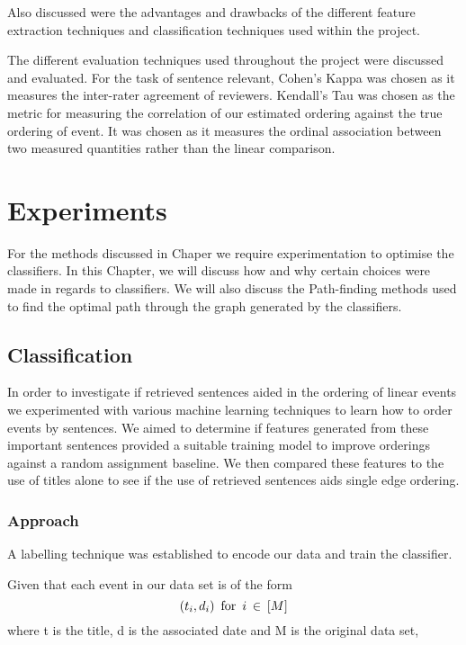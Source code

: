 \documentclass[bsc,frontabs,twoside,singlespacing,parskip,deptreport]{infthesis}     %
\begin{document}
Also discussed were the advantages and  drawbacks of the different feature extraction techniques and classification
techniques used within the project.

The different evaluation techniques used throughout the project were discussed and evaluated. 
For the task of sentence relevant, Cohen's Kappa \cite{wood2007understanding} was chosen as it measures the inter-rater agreement of
reviewers. Kendall's Tau \cite{abdi2007kendall} was chosen as the metric for measuring the correlation of our estimated ordering
against the true ordering of event. It was chosen as it measures the ordinal association between two
measured quantities rather than the linear comparison.


\chapter{Experiments}
For the methods discussed in Chaper \cite{chapter:methods} we require experimentation to optimise the classifiers.
In this Chapter, we will discuss how and why certain choices were made in regards to classifiers.
We will also discuss the Path-finding methods used to find the optimal path through the graph generated by the
classifiers.

\section{Classification}
In order to investigate if retrieved sentences aided in the  ordering of linear events we experimented with various
machine learning techniques to learn how to order events by sentences.
We aimed to determine if features generated from these important sentences provided a suitable training model
to improve orderings against a random assignment baseline. We then compared these features to the use of titles alone
to see if the use of retrieved sentences aids single edge ordering.


\subsection{Approach}
A labelling technique was established to encode our data and train the classifier.

Given that each event in our data set is of the form
\begin{equation}
  (t_{i},d_{i}) \hspace{0.5em} \text{for} \hspace{0.5em} i \hspace{0.2em}\in \hspace{0.2em} [M]\nonumber
    \end{equation}
    where t is the title, d is the associated date and M is the original data set,
\end{document}
